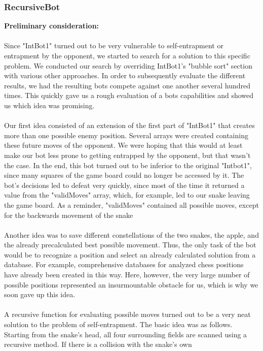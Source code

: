 \documentclass[a4paper,12pt]{article}
\begin{document}
\subsubsection{RecursiveBot}
\label{RecursiveBot}
\textbf{Preliminary consideration:}\\
\\Since "IntBot1" turned out to be very vulnerable to self-entrapment or entrapment by the opponent,
we started to search for a solution to this specific problem. We conducted our search by overriding
IntBot1's "bubble sort" section with various other approaches. In order to subsequently evaluate the
different results, we had the resulting bots compete against one another several hundred times. This
quickly gave us a rough evaluation of a bots capabilities and showed us which idea was promising.\\
\\Our first idea consisted of an extension of the first part of "IntBot1" that creates more than one
possible enemy position. Several arrays were created containing these future moves of the
opponent. We were hoping that this would at least make our bot less prone to getting entrapped by
the opponent, but that wasn't the case. In the end, this bot turned out to be inferior to the original
"Intbot1", since many squares of the game board could no longer be accessed by it. The bot's
decisions led to defeat very quickly, since most of the time it returned a value from the
"validMoves" array, which, for example, led to our snake leaving the game board. As a reminder,
"validMoves" contained all possible moves, except for the backwards movement of the snake\\
\\Another idea was to save different constellations of the two snakes, the apple, and the already
precalculated best possible movement. Thus, the only task of the bot would be to recognize a
position and select an already calculated solution from a database. For example, comprehensive
databases for analyzed chess positions have already been created in this way. \cite{chesstable}
Here, however, the very large number of possible positions represented an insurmountable obstacle
for us, which is why we soon gave up this idea.\\
\\A recursive function for evaluating possible moves turned out to be a very neat solution to the
problem of self-entrapment. The basic idea was as follows. Starting from the snake's head, all four
surrounding fields are scanned using a recursive method. If there is a collision with the snake's own
\end{document}
